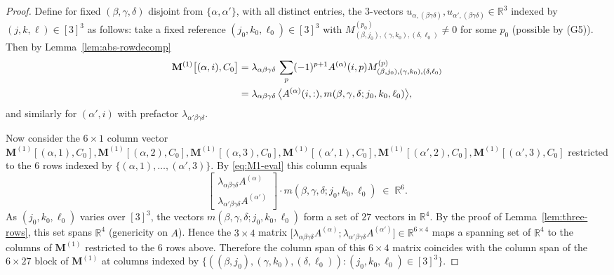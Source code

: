 \documentclass[12pt]{article}
\theoremstyle{definition}
\begin{document}
\begin{proof}
Define for fixed $(\beta,\gamma,\delta)$ disjoint from $\{\alpha,\alpha'\}$, with all distinct
entries, the $3$-vectors $u_{\alpha,(\beta\gamma\delta)},u_{\alpha',(\beta\gamma\delta)}\in\mathbb{R}^3$
indexed by $(j,k,\ell)\in[3]^3$ as follows: take a fixed reference $(j_0,k_0,\ell_0)\in[3]^3$
with $M^{(p_0)}_{(\beta,j_0),(\gamma,k_0),(\delta,\ell_0)}\neq 0$ for some $p_0$ (possible
by (G5)). Then by Lemma~\ref{lem:abs-rowdecomp}
\begin{align}
\mathbf{M}^{(1)}\bigl[(\alpha,i),C_0\bigr]
&=\lambda_{\alpha\beta\gamma\delta}\,\sum_{p}(-1)^{p+1}A^{(\alpha)}(i,p)M^{(p)}_{(\beta,j_0),(\gamma,k_0),(\delta,\ell_0)}\notag\\
&=\lambda_{\alpha\beta\gamma\delta}\,\bigl\langle A^{(\alpha)}(i,:),m(\beta,\gamma,\delta;j_0,k_0,\ell_0)\bigr\rangle,\label{eq:M1-eval}
\end{align}
and similarly for $(\alpha',i)$ with prefactor $\lambda_{\alpha'\beta\gamma\delta}$.

Now consider the $6\times 1$ column vector
$\mathbf{M}^{(1)}[(\alpha,1),C_0],\mathbf{M}^{(1)}[(\alpha,2),C_0],\mathbf{M}^{(1)}[(\alpha,3),C_0],\mathbf{M}^{(1)}[(\alpha',1),C_0],\mathbf{M}^{(1)}[(\alpha',2),C_0],\mathbf{M}^{(1)}[(\alpha',3),C_0]$
restricted to the $6$ rows indexed by $\{(\alpha,1),\ldots,(\alpha',3)\}$. By
\eqref{eq:M1-eval} this column equals
\begin{equation}\label{eq:6-column}
\begin{bmatrix}\lambda_{\alpha\beta\gamma\delta}A^{(\alpha)}\\ \lambda_{\alpha'\beta\gamma\delta}A^{(\alpha')}\end{bmatrix}\cdot m(\beta,\gamma,\delta;j_0,k_0,\ell_0)\;\in\;\mathbb{R}^6.
\end{equation}
As $(j_0,k_0,\ell_0)$ varies over $[3]^3$, the vectors $m(\beta,\gamma,\delta;j_0,k_0,\ell_0)$
form a set of $27$ vectors in $\mathbb{R}^4$. By the proof of Lemma~\ref{lem:three-rows},
this set spans $\mathbb{R}^4$ (genericity on $A$). Hence the $3\times 4$ matrix
$\bigl[\lambda_{\alpha\beta\gamma\delta}A^{(\alpha)};\lambda_{\alpha'\beta\gamma\delta}A^{(\alpha')}\bigr]\in\mathbb{R}^{6\times 4}$
maps a spanning set of $\mathbb{R}^4$ to the columns of $\mathbf{M}^{(1)}$ restricted to the
$6$ rows above. Therefore the column span of this $6\times 4$ matrix coincides with the
column span of the $6\times 27$ block of $\mathbf{M}^{(1)}$ at columns indexed by
$\{((\beta,j_0),(\gamma,k_0),(\delta,\ell_0)):(j_0,k_0,\ell_0)\in[3]^3\}$.


\end{proof}
\end{document}
